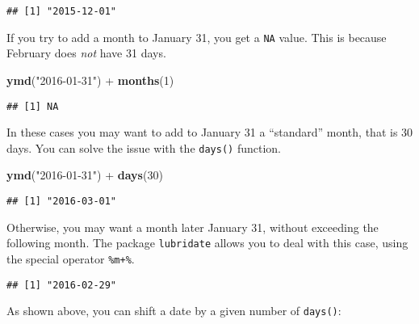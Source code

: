 \documentclass[]{book}
\newenvironment{Shaded}{\begin{snugshade}}{\end{snugshade}}
\newcommand{\KeywordTok}[1]{\textcolor[rgb]{0.13,0.29,0.53}{\textbf{{#1}}}}
\newcommand{\DecValTok}[1]{\textcolor[rgb]{0.00,0.00,0.81}{{#1}}}
\newcommand{\StringTok}[1]{\textcolor[rgb]{0.31,0.60,0.02}{{#1}}}
\newcommand{\NormalTok}[1]{{#1}}
\begin{document}
\begin{verbatim}
## [1] "2015-12-01"
\end{verbatim}

If you try to add a month to January 31, you get a \texttt{NA} value.
This is because February does \emph{not} have 31 days.

\begin{Shaded}
\begin{Highlighting}[]
\KeywordTok{ymd}\NormalTok{(}\StringTok{"2016-01-31"}\NormalTok{) +}\StringTok{ }\KeywordTok{months}\NormalTok{(}\DecValTok{1}\NormalTok{)}
\end{Highlighting}
\end{Shaded}

\begin{verbatim}
## [1] NA
\end{verbatim}

In these cases you may want to add to January 31 a ``standard'' month,
that is 30 days. You can solve the issue with the \texttt{days()}
function.

\begin{Shaded}
\begin{Highlighting}[]
\KeywordTok{ymd}\NormalTok{(}\StringTok{"2016-01-31"}\NormalTok{) +}\StringTok{ }\KeywordTok{days}\NormalTok{(}\DecValTok{30}\NormalTok{)}
\end{Highlighting}
\end{Shaded}

\begin{verbatim}
## [1] "2016-03-01"
\end{verbatim}

Otherwise, you may want a month later January 31, without exceeding the
following month. The package \texttt{lubridate} allows you to deal with
this case, using the special operator \texttt{\%m+\%}.

\begin{Shaded}
\end{Shaded}

\begin{verbatim}
## [1] "2016-02-29"
\end{verbatim}

As shown above, you can shift a date by a given number of
\texttt{days()}:
\end{document}
